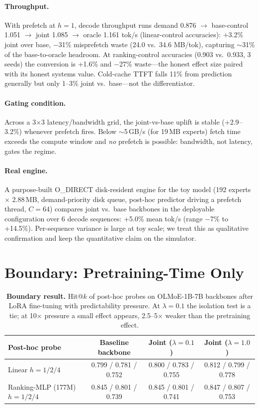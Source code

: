 \documentclass[10pt,letterpaper]{article}
\begin{document}
\paragraph{Throughput.} With prefetch at $h{=}1$, decode throughput runs demand 0.876 $\to$ base-control 1.051 $\to$ joint 1.085 $\to$ oracle 1.161 tok/s (linear-control accuracies): +3.2\% joint over base, $-$31\% misprefetch waste (24.0 vs.\ 34.6 MB/tok), capturing $\sim$31\% of the base-to-oracle headroom. At ranking-control accuracies (0.903 vs.\ 0.933, 3 seeds) the conversion is +1.6\% and $-$27\% waste---the honest effect size paired with its honest systems value. Cold-cache TTFT falls 11\% from prediction generally but only 1--3\% joint vs.\ base---not the differentiator.

\paragraph{Gating condition.} Across a 3$\times$3 latency/bandwidth grid, the joint-vs-base uplift is stable (+2.9--3.2\%) whenever prefetch fires. Below $\sim$5\,GB/s (for 19\,MB experts) fetch time exceeds the compute window and \emph{no} prefetch is possible: bandwidth, not latency, gates the regime.

\paragraph{Real engine.} A purpose-built O\_DIRECT disk-resident engine for the toy model (192 experts $\times$ 2.88\,MB, demand-priority disk queue, post-hoc predictor driving a prefetch thread, $C{=}64$) compares joint vs.\ base backbones in the deployable configuration over 6 decode sequences: +5.0\% mean tok/s (range $-$7\% to +14.5\%). Per-sequence variance is large at toy scale; we treat this as qualitative confirmation and keep the quantitative claim on the simulator.

\section{Boundary: Pretraining-Time Only}
\label{sec:boundary}

\begin{table}[t]
  \centering
  \caption{\textbf{Boundary result.} Hit@$k$ of post-hoc probes on OLMoE-1B-7B backbones after LoRA fine-tuning with predictability pressure. At $\lambda{=}0.1$ the isolation test is a tie; at 10$\times$ pressure a small effect appears, 2.5--5$\times$ weaker than the pretraining effect.}
  \label{tab:tierc}
  \begin{tabular}{lccc}
    \toprule
    Post-hoc probe & Baseline backbone & Joint ($\lambda{=}0.1$) & Joint ($\lambda{=}1.0$) \\
    \midrule
    Linear $h{=}1/2/4$ & 0.799 / 0.781 / 0.752 & 0.800 / 0.783 / 0.755 & 0.812 / 0.799 / 0.778 \\
    Ranking-MLP (177M) $h{=}1/2/4$ & 0.845 / 0.801 / 0.739 & 0.845 / 0.801 / 0.741 & 0.847 / 0.807 / 0.753 \\
    \bottomrule
  \end{tabular}
\end{table}
\end{document}
